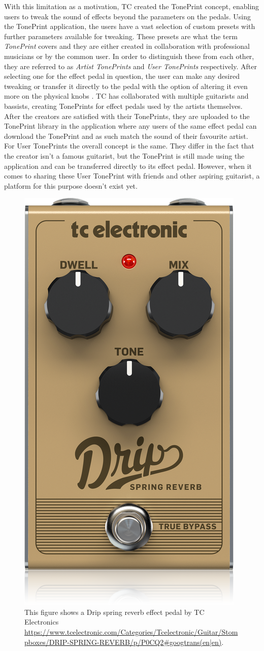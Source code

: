 With this limitation as a motivation, TC created the TonePrint concept, enabling users to tweak the sound of effects beyond the parameters on the pedals. Using the TonePrint application, the users have a vast selection of custom presets with further parameters available for tweaking. These presets are what the term \textit{TonePrint} covers and they are either created in collaboration with professional musicians or by the common user. In order to distinguish these from each other, they are referred to as \textit{Artist TonePrints} and \textit{User TonePrints} respectively. After selecting one for the effect pedal in question, the user can make any desired tweaking or transfer it directly to the pedal with the option of altering it even more on the physical knobs \parencite{PDF:TonePrintAnalyse}. TC has collaborated with multiple guitarists and bassists, creating TonePrints for effect pedals used by the artists themselves. After the creators are satisfied with their TonePrints, they are uploaded to the TonePrint library in the application where any users of the same effect pedal can download the TonePrint and as such match the sound of their favourite artist. For User TonePrints the overall concept is the same. They differ in the fact that the creator isn't a famous guitarist, but the TonePrint is still made using the application and can be transferred directly to its effect pedal. However, when it comes to sharing these User TonePrint with friends and other aspiring guitarist, a platform for this purpose doesn't exist yet.
%
\begin{figure}[H]
	\centering
	\includegraphics[width=.20\textwidth]{Graphics/EffectPedalExample}
	 \caption{This figure shows a Drip spring reverb effect pedal by TC Electronics \url{https://www.tcelectronic.com/Categories/Tcelectronic/Guitar/Stompboxes/DRIP-SPRING-REVERB/p/P0CQ2\#googtrans(en|en)}.}
    \label{fig:EffectPedalExample}
\end{figure}
%
